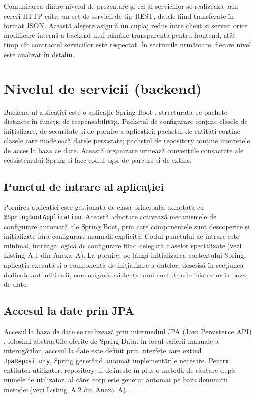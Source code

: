 Comunicarea dintre nivelul de prezentare și cel al serviciilor se realizează
prin cereri HTTP către un set de servicii de tip REST, datele fiind
transferate în format JSON. Această alegere asigură un cuplaj redus între
client și server: orice modificare internă a backend-ului rămâne transparentă
pentru frontend, atât timp cât contractul serviciilor este respectat. În
secțiunile următoare, fiecare nivel este analizat în detaliu.

\section{Nivelul de servicii (backend)}
\label{sec:backend}

Backend-ul aplicației este o aplicație Spring Boot \cite{Walls2022},
structurată pe pachete distincte în funcție de responsabilități. Pachetul de
configurare conține clasele de inițializare, de securitate și de pornire a
aplicației; pachetul de entități conține clasele care modelează datele
persistate; pachetul de repository conține interfețele de acces la baza de
date. Această organizare urmează convențiile consacrate ale ecosistemului
Spring și face codul ușor de parcurs și de extins.

\subsection{Punctul de intrare al aplicației}
\label{subsec:punct-intrare}

Pornirea aplicației este gestionată de clasa principală, adnotată cu
\texttt{@SpringBootApplication}. Această adnotare activează mecanismele de
configurare automată ale Spring Boot, prin care componentele sunt descoperite
și inițializate fără configurare manuală explicită. Codul punctului de intrare
este minimal, întreaga logică de configurare fiind delegată claselor
specializate (vezi Listing~A.1 din Anexa~A). La pornire, pe lângă
inițializarea contextului Spring, aplicația execută și o componentă de
inițializare a datelor, descrisă în secțiunea dedicată autentificării, care
asigură existența unui cont de administrator în baza de date.

\subsection{Accesul la date prin JPA}
\label{subsec:jpa}

Accesul la baza de date se realizează prin intermediul JPA (Java Persistence
API) \cite{Walls2022}, folosind abstracțiile oferite de Spring Data. În locul
scrierii manuale a interogărilor, accesul la date este definit prin interfețe
care extind \texttt{JpaRepository}, Spring generând automat implementările
necesare. Pentru entitatea utilizator, repository-ul definește în plus o
metodă de căutare după numele de utilizator, al cărei corp este generat
automat pe baza denumirii metodei (vezi Listing~A.2 din Anexa~A).

